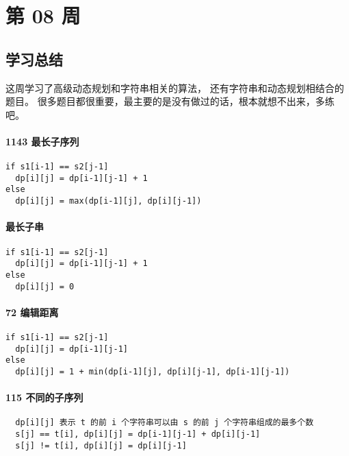 \newpage
\section{第 08 周}




\subsection{学习总结}

这周学习了高级动态规划和字符串相关的算法，
还有字符串和动态规划相结合的题目。
很多题目都很重要，最主要的是没有做过的话，根本就想不出来，多练吧。

\paragraph{1143 最长子序列}

\begin{verbatim}
if s1[i-1] == s2[j-1]
  dp[i][j] = dp[i-1][j-1] + 1
else
  dp[i][j] = max(dp[i-1][j], dp[i][j-1])
\end{verbatim}

\paragraph{最长子串}

\begin{verbatim}
if s1[i-1] == s2[j-1]
  dp[i][j] = dp[i-1][j-1] + 1
else
  dp[i][j] = 0
\end{verbatim}

\paragraph{72 编辑距离}

\begin{verbatim}
if s1[i-1] == s2[j-1]
  dp[i][j] = dp[i-1][j-1]
else
  dp[i][j] = 1 + min(dp[i-1][j], dp[i][j-1], dp[i-1][j-1])
\end{verbatim}

\paragraph{115 不同的子序列}

\begin{verbatim}
  dp[i][j] 表示 t 的前 i 个字符串可以由 s 的前 j 个字符串组成的最多个数
  s[j] == t[i], dp[i][j] = dp[i-1][j-1] + dp[i][j-1]
  s[j] != t[i], dp[i][j] = dp[i][j-1]
\end{verbatim}
